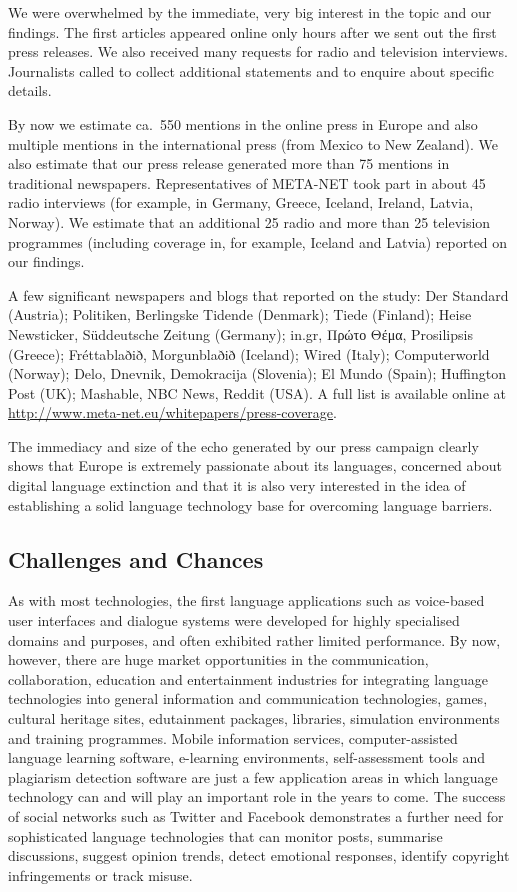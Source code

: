 \documentclass[10pt, plain]{../../metanetpaper}
\begin{document}
\begin{multicols}{2}
We were overwhelmed by the immediate, very big interest in the topic and our findings. The first articles appeared online only hours after we sent out the first press releases. We also received many requests for radio and television interviews. Journalists called to collect additional statements and to enquire about specific details. 

By now we estimate ca.~550 mentions in the online press in Europe and also multiple mentions in the international press (from Mexico to New Zealand). We also estimate that our press release generated more than 75 mentions in traditional newspapers. Representatives of META-NET took part in about 45 radio interviews (for example, in Germany, Greece, Iceland, Ireland, Latvia, Norway). We estimate that an additional 25 radio and more than 25 television programmes (including coverage in, for example, Iceland and Latvia) reported on our findings. 

A few significant newspapers and blogs that reported on the study: Der Standard (Austria); Politiken, Berlingske Tidende (Denmark); Tiede (Finland); Heise Newsticker, Süddeutsche Zeitung (Germany); in.gr, Πρώτο Θέμα, Pro\-silip\-sis (Greece); Fréttablaðið, Morgunblaðið (Iceland); Wired (Italy); Computerworld (Norway); Delo, Dnevnik, De\-mo\-kra\-cija (Slovenia); El Mundo (Spain); Huffington Post (UK); Mashable, NBC News, Reddit (USA). A full list is available online at \url{http://www.meta-net.eu/whitepapers/press-coverage}. 

The immediacy and size of the echo generated by our press campaign clearly shows that Europe is extremely passionate about its languages, concerned about digital language extinction and that it is also very interested in the idea of establishing a solid language technology base for overcoming language barriers. 

\subsection{Challenges and Chances}
\label{sec:lang-techn-as-a-key-to-the-future}

As with most technologies, the first language applications such as voice-based user interfaces and dialogue systems were developed for highly specialised domains and purposes, and often exhibited rather limited performance. By now, however, there are huge market opportunities in the communication, collaboration, education and entertainment industries for integrating language technologies into general information and communication technologies, games, cultural heritage sites, edutainment packages, libraries, simulation environments and training programmes. Mobile information services, computer-assisted language learning software, e-learning environments, self-assessment tools and plagiarism detection software are just a few application areas in which language technology can and will play an important role in the years to come. The success of social networks such as Twitter and Facebook demonstrates a further need for sophisticated language technologies that can monitor posts, summarise discussions, suggest opinion trends, detect emotional responses, identify copyright infringements or track misuse.


\end{multicols}
\end{document}
